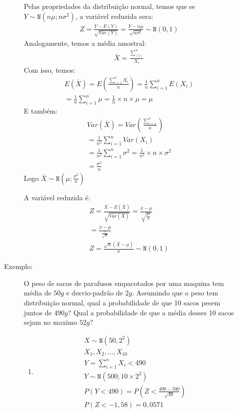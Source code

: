 \begin{description}
\begin{description}
  Pelas propriedades da distribuição normal, temos que se $Y\sim \mathtt{N}(n\mu; n\sigma^2)$, 
  a variável reduzida sera:
  \begin{align*}
    Z= \frac{Y- E(Y)}{\sqrt{Var(Y)}} = \frac{Y- n\mu}{\sqrt{n\sigma^2}} \sim \mathtt{N}(0,1)
  \end{align*}
  Analogamente, temos a média amostral:
  \begin{align*}
    \bar{X} = \frac{\sum \limits_{(i)}^{n}}{X_i}
  \end{align*}
  Com isso, temos:
  \begin{align*}
    E(\bar{X}) = E( \frac{\sum_{i=1}^n X_i}{n} )= \frac{1}{n}\sum_{i=1}^{n} E(X_i) \\
    = \frac{1}{n} \sum_{i=1}^n \mu = \frac{1}{n} \times n \times \mu = \mu
  \end{align*}
  E também:
  \begin{align*}
    Var(\bar{X}) = Var(\frac{\sum_{i=1}^n}{n}) \\
    = \frac{1}{n^2} \sum_{i=1}^{n} Var(X_i) \\
    = \frac{1}{n^2} \sum_{i=1}^{n} \sigma^2 = \frac{1}{n^2} \times n \times \sigma^2 \\
    = \frac{\sigma^2}{n}
  \end{align*}
  Logo $\bar{X} \sim \mathtt{N} ( \mu ; \frac{\sigma^2}{n} ) $

  A variável reduzida é:
  \begin{align*}
    Z = \frac{\bar{X}- E(\bar{X})}{\sqrt{Var(\bar{X})}} = \frac{\bar{x} - \mu}{\sqrt{\frac{\sigma^2}{n}}} \\
    = \frac{\bar{x}- \mu}{\frac{\sigma}{\sqrt{n}}} \\
    Z= \frac{\sqrt{n} (\bar{X} -\mu)}{\sigma} \sim \mathtt{N} (0,1)
  \end{align*}
\item [Exemplo:] O peso de sacos de parafusos empacotados por uma maquina tem média de $50g$ e desvio-padrão de $2g$.
  Assumindo que  o peso tem distribuição normal, qual a probabilidade de que 10 sacos pesem juntos de $490g$? 
  Qual a probabilidade de que a média desses 10 sacos sejam no maximo $52g$?

\begin{enumerate}[label=(\alph*)]
  \item
  \begin{align*}
    X \sim \mathtt{N} (50, 2^2) \\
    X_1, X_2, \ldots , X_{10 } \\
    Y= \sum_{i=1}^{n} X_i < 490 \\
    Y \sim \mathtt{N}(500 ; 10 \times 2^2) \\
    P(Y <490 ) = P(Z < \frac{490-500}{\sqrt{40}}) \\
    P(Z< -1,58) = 0,0571
  \end{align*}


\end{enumerate}
\end{description}
\end{description}
